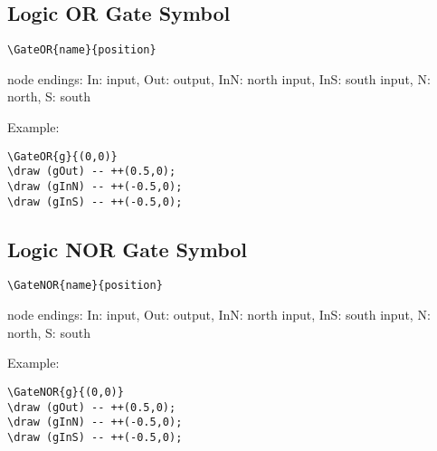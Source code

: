 \documentclass[parskip=full]{scrartcl}
\begin{document}
\subsection{Logic OR Gate Symbol}

\begin{verbatim}
\GateOR{name}{position}
\end{verbatim}
node endings: In: input, Out: output,
              InN: north input, InS: south input,
              N: north, S: south

Example:\\
\begin{minipage}{0.8\textwidth}
\begin{verbatim}
\GateOR{g}{(0,0)}
\draw (gOut) -- ++(0.5,0);
\draw (gInN) -- ++(-0.5,0);
\draw (gInS) -- ++(-0.5,0);
\end{verbatim}
\end{minipage}
\begin{minipage}{0.19\textwidth}
\end{minipage}

\subsection{Logic NOR Gate Symbol}

\begin{verbatim}
\GateNOR{name}{position}
\end{verbatim}
node endings: In: input, Out: output,
              InN: north input, InS: south input,
              N: north, S: south

Example:\\
\begin{minipage}{0.8\textwidth}
\begin{verbatim}
\GateNOR{g}{(0,0)}
\draw (gOut) -- ++(0.5,0);
\draw (gInN) -- ++(-0.5,0);
\draw (gInS) -- ++(-0.5,0);
\end{verbatim}
\end{minipage}
\begin{minipage}{0.19\textwidth}
\end{minipage}
\end{document}
